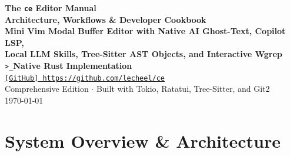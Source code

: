 \documentclass[11pt,a4paper,openany]{book}
\begin{document}
\frontmatter

\begin{titlepage}
    \centering
    \vspace*{2cm}
    {\Huge\bfseries\sffamily The \texttt{ce} Editor Manual}\\[0.6em]
    {\LARGE\bfseries\sffamily Architecture, Workflows \& Developer Cookbook}\\[1.5em]
    {\large\color{catMauve}\textbf{Mini Vim Modal Buffer Editor with Native AI Ghost-Text, Copilot LSP,}}\\
    {\large\color{catMauve}\textbf{Local LLM Skills, Tree-Sitter AST Objects, and Interactive Wgrep}}\\[3cm]

    \texttt{>\_}\hspace{0.8em}\textbf{Native Rust Implementation}\\[0.5em]
    \href{https://github.com/lecheel/ce}{\texttt{[GitHub] https://github.com/lecheel/ce}}\\[4cm]

    \vfill
    {\small\sffamily Comprehensive Edition $\cdot$ Built with Tokio, Ratatui, Tree-Sitter, and Git2}\\[0.3em]
    {\small\sffamily \today}
\end{titlepage}

\tableofcontents

\mainmatter

\chapter{System Overview \& Architecture}
\end{document}
